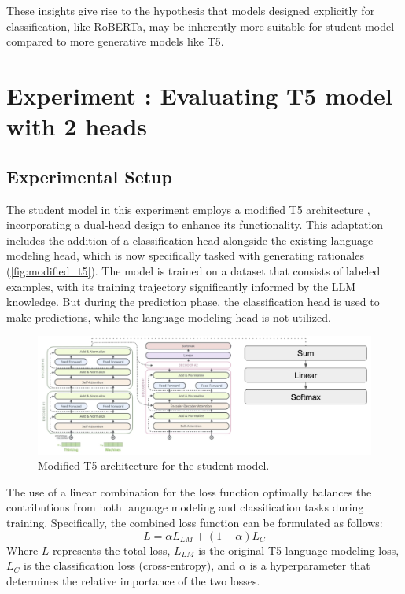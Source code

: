 These insights give rise to the hypothesis that models designed explicitly for classification, like RoBERTa, may be inherently more suitable for student model compared to more generative models like T5.

\newpage

\section{Experiment \theexperiment: Evaluating T5 model with 2 heads}
\label{sec:t5_2heads}

\subsection*{Experimental Setup}

The student model in this experiment employs a modified T5 architecture \cite{t5}, incorporating a dual-head design to enhance its functionality. This adaptation includes the addition of a classification head alongside the existing language modeling head, which is now specifically tasked with generating rationales (\autoref{fig:modified_t5}). The model is trained on a dataset that consists of labeled examples, with its training trajectory significantly informed by the LLM knowledge. But during the prediction phase, the classification head is used to make predictions, while the language modeling head is not utilized.

\begin{figure}[hbt]
    \centering
    \includegraphics[width=0.99\linewidth]{figs/modified_t5.png}
    \caption{Modified T5 architecture for the student model.}
    \label{fig:modified_t5}
\end{figure}

The use of a linear combination for the loss function optimally balances the contributions from both language modeling and classification tasks during training. Specifically, the combined loss function can be formulated as follows:
$$ L = \alpha L_{LM} + (1 - \alpha) L_{C} $$
Where $L$ represents the total loss, $L_{LM}$ is the original T5 language modeling loss, $L_{C}$ is the classification loss (cross-entropy), and $\alpha$ is a hyperparameter that determines the relative importance of the two losses.

